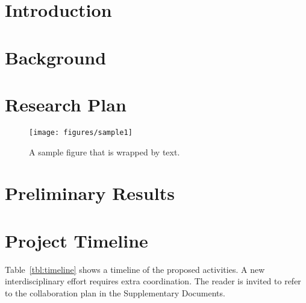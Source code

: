 

\section{Introduction}
\label{sec:intro}

\lipsum{}

\section{Background}
\label{sec:bg}

\lipsum{}

\section{Research Plan}
\label{sec:methods}

\lipsum{}

\setlength\intextsep{0pt}
\begin{wrapfigure}[20]{R}{2.4in}
 \vspace{-15pt}
 \centering
 \texttt{[image: figures/sample1]}
 \caption{A sample figure that is wrapped by text.}
 \label{fig:sample}
\end{wrapfigure}

\section{Preliminary Results}
\label{sec:prior}

\lipsum[4-6]{}

\section{Project Timeline}
\label{sec:timeline}

Table~\ref{tbl:timeline} shows a timeline of the proposed activities.
A new interdisciplinary effort requires extra coordination. The reader is invited to refer to the collaboration plan in the Supplementary Documents.

